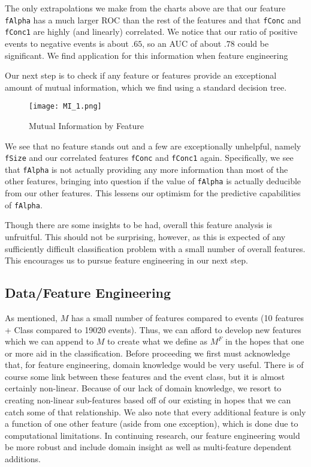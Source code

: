 \documentclass[12pt, a4paper]{article} %
\begin{document}
The only extrapolations we make from the charts above are that our feature {\tt fAlpha} has a much larger ROC than the rest of the features and that {\tt fConc} and {\tt fConc1} are highly (and linearly) correlated. We notice that our ratio of positive events to negative events is about $.65$, so an AUC of about $.78$ could be significant. We find application for this information when feature engineering 

Our next step is to check if any feature or features provide an exceptional amount of mutual information, which we find using a standard decision tree. 

\begin{figure}[!h]
    \centering
    \texttt{[image: MI\_1.png]} 
    \caption{Mutual Information by Feature}
\end{figure}

We see that no feature stands out and a few are exceptionally unhelpful, namely {\tt fSize} and our correlated features {\tt fConc} and {\tt fConc1} again. Specifically, we see that {\tt fAlpha} is not actually providing any more information than most of the other features, bringing into question if the value of {\tt fAlpha} is actually deducible from our other features. This lessens our optimism for the predictive capabilities of {\tt fAlpha}.

Though there are some insights to be had, overall this feature analysis is unfruitful. This should not be surprising, however, as this is expected of any sufficiently difficult classification problem with a small number of overall features. This encourages us to pursue feature engineering in our next step. 

\subsection{Data/Feature Engineering}

As mentioned, $M$ has a small number of features compared to events (10 features + Class compared to 19020 events). Thus, we can afford to develop new features which we can append to $M$ to create what we define as $M^{F}$ in the hopes that one or more aid in the classification. Before proceeding we first must acknowledge that, for feature engineering, domain knowledge would be very useful. There is of course some link between these features and the event class, but it is almost certainly non-linear. Because of our lack of domain knowledge, we resort to creating non-linear sub-features based off of our existing in hopes that we can catch some of that relationship. We also note that every additional feature is only a function of one other feature (aside from one exception), which is done due to computational limitations. In continuing research, our feature engineering would be more robust and include domain insight as well as multi-feature dependent additions.
\end{document}
